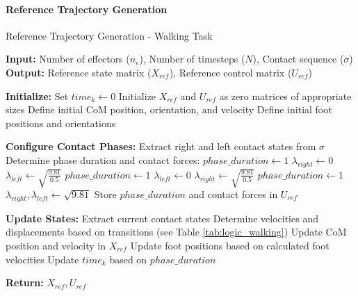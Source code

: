 \documentclass[main.tex]{subfiles}
\begin{document}
\paragraph{Reference Trajectory Generation}
\begin{algorithm}[H]
\caption{Reference Trajectory Generation - Walking Task}
\label{alg:walking_task}
\textbf{Input:} Number of effectors ($n_e$), Number of timesteps ($N$), Contact sequence ($\sigma$) \\
\textbf{Output:} Reference state matrix ($X_{ref}$), Reference control matrix ($U_{ref}$)

\begin{algorithmic}[1]
\State \textbf{Initialize:}
\State Set $time_k \gets 0$
\State Initialize $X_{ref}$ and $U_{ref}$ as zero matrices of appropriate sizes
\State Define initial CoM position, orientation, and velocity
\State Define initial foot positions and orientations

\State \textbf{Configure Contact Phases:}
    \State Extract right and left contact states from $\sigma$
    \State Determine phase duration and contact forces:
        \State $phase\_duration \gets 1$
        \State $\lambda_{right} \gets 0$
        \State $\lambda_{left} \gets \sqrt{\frac{9.81}{0.5}}$
        \State $phase\_duration \gets 1$
        \State $\lambda_{left} \gets 0$
        \State $\lambda_{right} \gets \sqrt{\frac{9.81}{0.5}}$
    \Else
        \State $phase\_duration \gets 1$
        \State $\lambda_{right}, \lambda_{left} \gets \sqrt{9.81}$
    \EndIf
    \State Store $phase\_duration$ and contact forces in $U_{ref}$
\EndFor

\State \textbf{Update States:}
    \State Extract current contact states
    \State Determine velocities and displacements based on transitions (see Table \ref{tab:logic_walking})
    \State Update CoM position and velocity in $X_{ref}$
    \State Update foot positions based on calculated foot velocities
    \State Update $time_k$ based on $phase\_duration$
\EndFor

\State \textbf{Return:} $X_{ref}, U_{ref}$
\end{algorithmic}
\end{algorithm}
\end{document}
